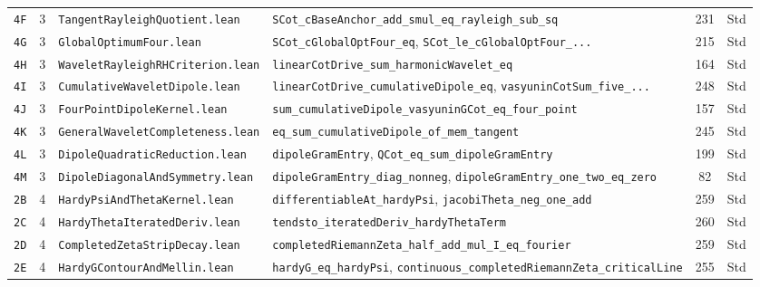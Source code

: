 \documentclass[11pt,a4paper]{article}
\theoremstyle{definition}
\begin{document}
\begin{longtable}{@{}ll>{\raggedright\arraybackslash}p{5.2cm}>{\raggedright\arraybackslash}p{6.8cm}cc@{}}
\texttt{4F} & 3 & \texttt{TangentRayleighQuotient.lean} & \texttt{SCot\_\allowbreak cBaseAnchor\_\allowbreak add\_\allowbreak smul\_\allowbreak eq\_\allowbreak rayleigh\_\allowbreak sub\_\allowbreak sq} & 231 & Std \\
\texttt{4G} & 3 & \texttt{GlobalOptimumFour.lean} & \texttt{SCot\_\allowbreak cGlobalOptFour\_\allowbreak eq}, \texttt{SCot\_\allowbreak le\_\allowbreak cGlobalOptFour\_\allowbreak ...} & 215 & Std \\
\texttt{4H} & 3 & \texttt{WaveletRayleighRHCriterion.lean} & \texttt{linearCotDrive\_\allowbreak sum\_\allowbreak harmonicWavelet\_\allowbreak eq} & 164 & Std \\
\texttt{4I} & 3 & \texttt{CumulativeWaveletDipole.lean} & \texttt{linearCotDrive\_\allowbreak cumulativeDipole\_\allowbreak eq}, \texttt{vasyuninCotSum\_\allowbreak five\_\allowbreak ...} & 248 & Std \\
\texttt{4J} & 3 & \texttt{FourPointDipoleKernel.lean} & \texttt{sum\_\allowbreak cumulativeDipole\_\allowbreak vasyuninGCot\_\allowbreak eq\_\allowbreak four\_\allowbreak point} & 157 & Std \\
\texttt{4K} & 3 & \texttt{GeneralWaveletCompleteness.lean} & \texttt{eq\_\allowbreak sum\_\allowbreak cumulativeDipole\_\allowbreak of\_\allowbreak mem\_\allowbreak tangent} & 245 & Std \\
\texttt{4L} & 3 & \texttt{DipoleQuadraticReduction.lean} & \texttt{dipoleGramEntry}, \texttt{QCot\_\allowbreak eq\_\allowbreak sum\_\allowbreak dipoleGramEntry} & 199 & Std \\
\texttt{4M} & 3 & \texttt{DipoleDiagonalAndSymmetry.lean} & \texttt{dipoleGramEntry\_\allowbreak diag\_\allowbreak nonneg}, \texttt{dipoleGramEntry\_\allowbreak one\_\allowbreak two\_\allowbreak eq\_\allowbreak zero} & 82 & Std \\
\texttt{2B} & 4 & \texttt{HardyPsiAndThetaKernel.lean} & \texttt{differentiableAt\_\allowbreak hardyPsi}, \texttt{jacobiTheta\_\allowbreak neg\_\allowbreak one\_\allowbreak add} & 259 & Std \\
\texttt{2C} & 4 & \texttt{HardyThetaIteratedDeriv.lean} & \texttt{tendsto\_\allowbreak iteratedDeriv\_\allowbreak hardyThetaTerm} & 260 & Std \\
\texttt{2D} & 4 & \texttt{CompletedZetaStripDecay.lean} & \texttt{completedRiemannZeta\_\allowbreak half\_\allowbreak add\_\allowbreak mul\_\allowbreak I\_\allowbreak eq\_\allowbreak fourier} & 259 & Std \\
\texttt{2E} & 4 & \texttt{HardyGContourAndMellin.lean} & \texttt{hardyG\_\allowbreak eq\_\allowbreak hardyPsi}, \texttt{continuous\_\allowbreak completedRiemannZeta\_\allowbreak criticalLine} & 255 & Std \\

\end{longtable}
\end{document}
